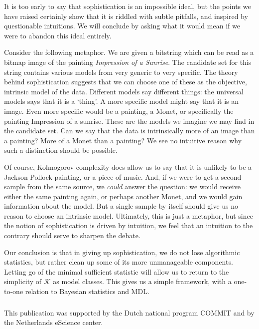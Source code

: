 \documentclass{style/llncs}
\newcommand{\K}{\mathscr K}
\begin{document}
It is too early to say that sophistication is an impossible ideal, but the points we have raised certainly show that it is riddled with subtle pitfalls, and inspired by questionable intuitions. We will conclude by asking what it would mean if we were to abandon this ideal entirely.

Consider the following metaphor. We are given a bitstring which can be read as a bitmap image of the painting \emph{Impression of a Sunrise}. The candidate set for this string contains various models from very generic to very specific. The theory behind sophistication suggests that we can choose one of these as the objective, intrinsic model of the data. Different models say different things: the universal models says that it is a `thing'. A more specific model might say that it is an image. Even more specific would be a painting, a Monet, or specifically the painting Impression of a sunrise. These are the models we imagine we may find in the candidate set. Can we say that the data is intrinsically more of an image than a painting? More of a Monet than a painting? We see no intuitive reason why such a distinction should be possible.    

Of course, Kolmogorov complexity does allow us to say that it is unlikely to be a Jackson Pollock painting, or a piece of music. And, if we were to get a second sample from the same source, we \emph{could} answer the question: we would receive either the same painting again, or perhaps another Monet, and we would gain information about the model. But a single sample by itself should give us no reason to choose an intrinsic model. Ultimately, this is just a metaphor, but since the notion of sophistication is driven by intuition, we feel that an intuition to the contrary should serve to sharpen the debate.

Our conclusion is that in giving up sophistication, we do not lose algorithmic statistics, but rather clean up some of its more unmanageable components. Letting go of the minimal sufficient statistic will allow us to return to the simplicity of $\K$ as model classes. This gives us a simple framework, with a one-to-one relation to Bayesian statistics and MDL. 

\subsubsection*{\ackname}

This publication was supported by the Dutch national program COMMIT and by  the Netherlands eScience center.




\appendix
\end{document}
